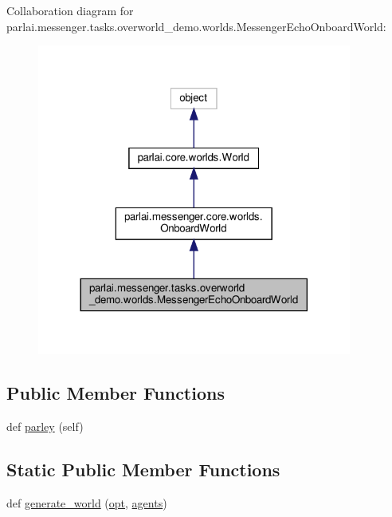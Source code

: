 Collaboration diagram for parlai.\+messenger.\+tasks.\+overworld\+\_\+demo.\+worlds.\+Messenger\+Echo\+Onboard\+World\+:
\nopagebreak
\begin{figure}[H]
\begin{center}
\leavevmode
\includegraphics[width=293pt]{classparlai_1_1messenger_1_1tasks_1_1overworld__demo_1_1worlds_1_1MessengerEchoOnboardWorld__coll__graph}
\end{center}
\end{figure}
\subsection*{Public Member Functions}
\begin{DoxyCompactItemize}
\item 
def \hyperlink{classparlai_1_1messenger_1_1tasks_1_1overworld__demo_1_1worlds_1_1MessengerEchoOnboardWorld_abfb72d69c41d2ac33060d4431551ea74}{parley} (self)
\end{DoxyCompactItemize}
\subsection*{Static Public Member Functions}
\begin{DoxyCompactItemize}
\item 
def \hyperlink{classparlai_1_1messenger_1_1tasks_1_1overworld__demo_1_1worlds_1_1MessengerEchoOnboardWorld_a97029bbeac8283a3d03b3ff82db11dae}{generate\+\_\+world} (\hyperlink{classparlai_1_1core_1_1worlds_1_1World_a3640d92718acd3e6942a28c1ab3678bd}{opt}, \hyperlink{classparlai_1_1core_1_1worlds_1_1World_a728f75194cc26ea4035047c46cf62608}{agents})
\end{DoxyCompactItemize}
